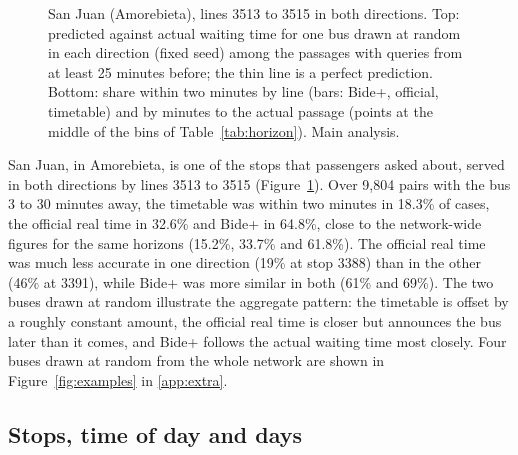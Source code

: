\begin{figure}[t]
\caption{San Juan (Amorebieta), lines 3513 to 3515 in both directions. Top: predicted against actual waiting time for one
bus drawn at random in each direction (fixed seed) among the passages with queries from at least 25 minutes before; the
thin line is a perfect prediction. Bottom: share within two minutes by line (bars: Bide+, official, timetable) and by
minutes to the actual passage (points at the middle of the bins of Table~\ref{tab:horizon}). Main analysis.}
\label{fig:sanjuan}
\end{figure}

San Juan, in Amorebieta, is one of the stops that passengers asked about, served in both directions by lines 3513 to 3515
(Figure~\ref{fig:sanjuan}). Over 9,804 pairs with the bus 3 to 30 minutes away, the timetable was within two minutes in
18.3\% of cases, the official real time in 32.6\% and Bide+ in 64.8\%, close to the network-wide figures for the same
horizons (15.2\%, 33.7\% and 61.8\%). The official real time was much less accurate in one direction (19\% at stop 3388)
than in the other (46\% at 3391), while Bide+ was more similar in both (61\% and 69\%). The two buses drawn at random illustrate the aggregate pattern:
the timetable is offset by a roughly constant amount, the official real time is closer but announces the bus later than it
comes, and Bide+ follows the actual waiting time most closely. Four buses drawn at random from the whole network are shown in
Figure~\ref{fig:examples} in \ref{app:extra}.

\subsection{Stops, time of day and days}

